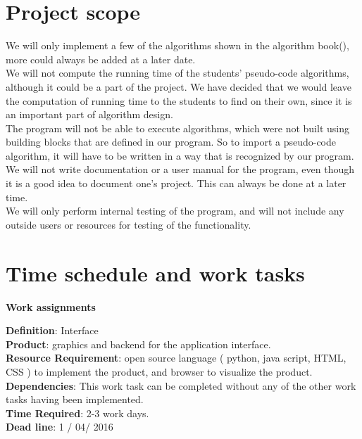 \documentclass[11pt]{article}
\begin{document}
\section*{Project scope}
We will only implement a few of the algorithms shown in the algorithm book(\cite{algbog}), more could always be added at a later date.\\
We will not compute the running time of the students' pseudo-code algorithms, although it could be a part of the project. We have decided that we would leave the computation of running time to the students to find on their own, since it is an important part of algorithm design.\\
The program will not be able to execute algorithms, which were not built using building blocks that are defined in our program. So to import a pseudo-code algorithm, it will have to be written in a way that is recognized by our program.\\
We will not write documentation or a user manual for the program, even though it is a good idea to document one's project. This can always be done at a later time. \\
We will only perform internal testing of the program, and will not include any outside users or resources for testing of the functionality.

\newpage
\section*{Time schedule and work tasks}
\noindent\makebox[\linewidth]{\rule{\paperwidth}{0.4pt}}
\begin{center}\textbf{Work assignments}\end{center}
\noindent\makebox[\linewidth]{\rule{\paperwidth}{0.4pt}}


\noindent\textbf{Definition}: Interface\\
\textbf{Product}: graphics and backend for the application interface.\\
\textbf{Resource Requirement}: open source language ( python, java script, HTML, CSS ) to implement the product, and browser to visualize the product. \\
\textbf{Dependencies}: This work task can be completed without any of the other work tasks having been implemented.\\
\textbf{Time Required}: 2-3 work days.\\
\textbf{Dead line}: 1 / 04/ 2016\\
\noindent\makebox[\linewidth]{\rule{\paperwidth}{0.4pt}}
\end{document}
